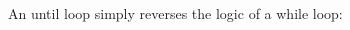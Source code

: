 \begin{center}
\tabletail{}
\tablelasttail{}
\begin{supertabular}{|m{1.9073598in}|m{2.75596in}|}

\end{supertabular}
\end{center}

An until loop simply reverses the logic of a while loop:

